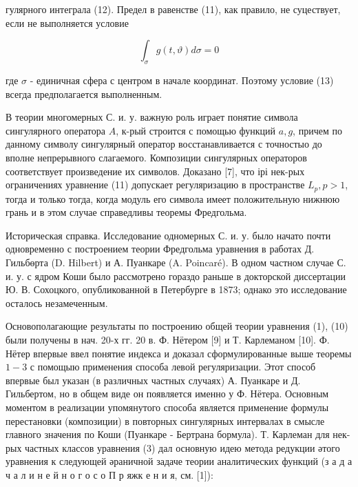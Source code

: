 \documentclass[10pt]{article}
\begin{document}
гулярного интеграла (12). Предел в равенстве (11), как правило, не суцествует, если не выполняется условие



\[

\int_{\sigma} g(t, \vartheta) d \sigma=0

\]



где $\sigma$ - единичная сфера с центром в начале координат. Поэтому условие (13) всегда предполагается выполненным.



В теории многомерных С. и. у. важную роль играет понятие символа сингулярного оператора $A$, к-рый строится с помощью функций $a, g$, причем по данному символу сингулярный оператор восстанавливается с точностыо до вполне непрерывного слагаемого. Композиции сингулярных операторов соответствует произведение их символов. Доказано [7], что ірі нек-рых ограничениях уравнение (11) допускает регуляризацию в пространстве $L_{p}, p>1$, тогда и только тогда, когда модуль его символа имеет положительную нижнюю грань и в этом случае справедливы теоремы Фредгольма.



Историческая справка. Исследование одномерных С. и. у. было начато почти одновременно с построением теории Фредгольма уравнения в работах Д. Гильбөрта (D. Hilbert) и А. Пуанкаре (A. Poincaré). В одном частном случае С. и. у. с ядром Коши было рассмотрено гораздо раньше в докторской диссертации Ю. В. Сохоцкого, опубликованной в Петербурге в 1873; однако это исследование осталось незамеченным.



Основополагающие результаты по построению общей теории уравнения (1), (10) были получены в нач. 20-х гг. 20 в. Ф. Нётером [9] и Т. Карлеманом [10]. Ф. Нётер впервые ввел понятие индекса и доказал сформулированные выше теоремы $1-3$ с помощыю применения способа левой регуляризации. Этот способ впервые был указан (в различных частных случаях) А. Пуанкаре и Д. Гильбертом, но в общем виде он появляется именно у Ф. Нётера. Основным моментом в реализации упомянутого способа является применение формулы перестановки (композиции) в повторных сингулярных интервалах в смысле главного значения по Коши (Пуанкаре - Бертрана бормула). Т. Карлеман для нек-рых частных классов уравнения (3) дал основную идею метода редукции әтого уравнения к следующей әраничной задаче теории аналитических функций (з а д а ч а л и н е й н о г о с о П р яжк е н и я, см. [1]):
\end{document}
